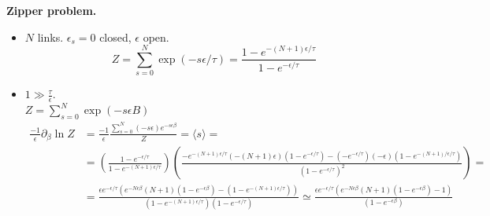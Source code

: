 \textbf{Zipper problem.}  \begin{itemize}
\item[(a)]$N$ links.  $\epsilon_s = 0$ closed, $\epsilon$ open.  
\[
Z = \sum_{s=0}^N \exp{ (-s\epsilon/\tau ) } = \frac{1 - e^{-(N+1)\epsilon/\tau} }{ 1 - e^{-\epsilon/\tau} }
\]
\item[(b)] $1 \gg \frac{\tau}{ \epsilon }$.  \\
$Z = \sum_{s=0}^N \exp{ ( - s \epsilon B ) }$
\[
\begin{aligned}
  \frac{-1}{\epsilon} \partial_{ \beta} \ln{Z} & = \frac{-1}{\epsilon} \frac{ \sum_{s=0}^N (-s\epsilon) e^{-s\epsilon \beta} }{Z} = \langle s \rangle = \\ 
  & = \left( \frac{1 - e^{- \epsilon/\tau } }{ 1 - e^{ - (N+1)\epsilon/\tau} } \right) \left( \frac{  -e^{-(N+1)\epsilon/\tau } (-(N+1) \epsilon)(1 - e^{-\epsilon/\tau} ) - (-e^{-\epsilon/\tau} ) (- \epsilon )(1 - e^{-(N+1)/\epsilon/\tau } ) }{ (1 - e^{-\epsilon/\tau} )^2 } \right) = \\
& = \frac{  \epsilon e^{-\epsilon/\tau} ( e^{-N\epsilon \beta} ( N+1) (1-e^{-\epsilon \beta} ) - (1 - e^{-(N+1)\epsilon/\tau} ) ) }{  ( 1 - e^{-(N+1) \epsilon/\tau } ) (1- e^{-\epsilon/\tau} ) } \simeq \frac{ \epsilon e^{-\epsilon/\tau} ( e^{-N\epsilon \beta} (N+1)(1 - e^{-\epsilon \beta }) - 1 ) }{ (1- e^{-\epsilon \beta} ) }
\end{aligned}
\]


\end{itemize}
